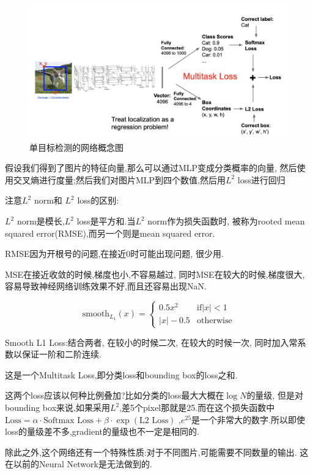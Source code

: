 \begin{figure}[H]
    \centering
    \includegraphics[scale=0.4]{figures/single_obj_det.png}
    \caption{单目标检测的网络概念图}
\end{figure}

假设我们得到了图片的特征向量,那么可以通过MLP变成分类概率的向量,
然后使用交叉熵进行度量;然后我们对图片MLP到四个数值,然后用$L^2$ 
loss进行回归

注意$L^2$ norm和 $L^2$ loss的区别:

$L^2$ norm是模长,$L^2$ loss是平方和.当$L^2$ norm作为损失函数时,
被称为rooted mean squared error(RMSE),而另一个则是mean squared error.

RMSE因为开根号的问题,在接近0时可能出现问题, 很少用.

MSE在接近收敛的时候,梯度也小,不容易越过, 同时MSE在较大的时候,梯度很大,
容易导致神经网络训练效果不好,而且还容易出现NaN.

\[\mathrm{smooth}_{L_1}(x)=\left\{\begin{array}{ll}0.5x^2&\mathrm{if}|x|<1\\|x|-0.5&\mathrm{otherwise}\end{array}\right.\]

Smooth L1 Loss:结合两者, 在较小的时候二次, 
在较大的时候一次, 同时加入常系数以保证一阶和二阶连续.

这是一个Multitask Loss,即分类loss和bounding box的loss之和.

这两个loss应该以何种比例叠加?比如分类的loss最大大概在$\log N$的量级,
但是对bounding box来说,如果采用$L^2$,差5个pixel那就是25.而在这个损失函数中
$
\text{Loss} = \alpha \cdot \text{Softmax Loss} + \beta \cdot \exp(\text{L2 Loss})
$
,$e^{25}$是一个非常大的数字.所以即使loss的量级差不多,gradient的量级也不一定是相同的.

除此之外,这个网络还有一个特殊性质:对于不同图片,可能需要不同数量的输出.
这在以前的Neural Network是无法做到的.

